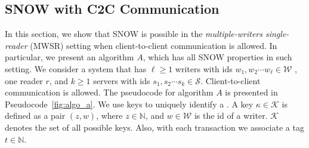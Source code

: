 \subsection{SNOW with C2C Communication}
\label{app:algorithm-a}
In this section,  we show that SNOW is possible in the   \emph{multiple-writers single-reader} 
(MWSR) setting %
when client-to-client communication is allowed. In particular, we present an algorithm $A$, which has all SNOW properties in such setting.
We consider a system that has $\ell \geq 1$ writers with ids $w_1, 
w_2 \cdots w_{\ell} \in \mathcal{W}$ 
, one reader $r$, and  $k \geq 1$ servers with ids $s_1, s_2\cdots s_k \in \mathcal{S}$. 
Client-to-client communication is allowed. 
%			
%
The pseudocode for algorithm $A$ is presented in Pseudocode~\ref{fig:algo_a}. 
%
We use keys to uniquely identify a \wot{}.  A key $\kappa \in \mathcal{K}$ is defined as a pair $(z, w)$, 
where $z \in \mathbb{N}$, and $w \in \mathcal{W}$ is the id of a writer. $\mathcal{K}$ denotes the set of all possible keys. 
Also, with each transaction we associate a tag $t \in \mathbb{N}$. %


